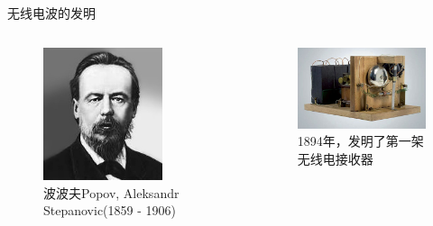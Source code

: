 \begin{frame}{无线电波的发明}
 \begin{columns}
  \begin{column}{0.35\linewidth}
   \begin{figure}
    \includegraphics[width=3.5cm]{popov.jpg}
    \caption{波波夫Popov, Aleksandr Stepanovic(1859 - 1906)}
   \end{figure}
  \end{column}
  \begin{column}{0.65\linewidth}
   \begin{figure}
    \includegraphics[width=6.5cm]{wirelessreceiver.jpg}
    \caption{1894年，发明了第一架无线电接收器}
   \end{figure}
  \end{column}
 \end{columns}
\end{frame}


